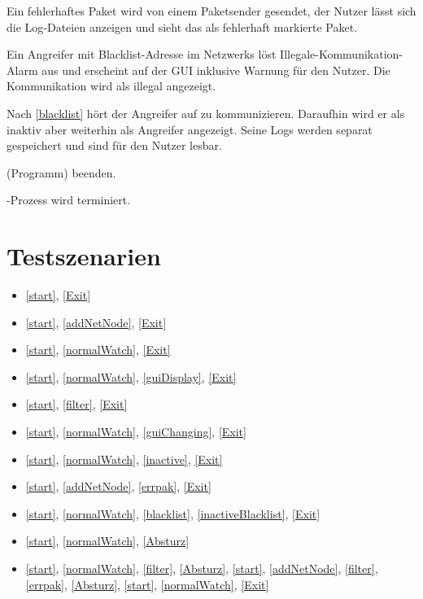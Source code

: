 \begin{description}[style=multiline, leftmargin=4cm, labelwidth=4cm]
  \item[\namedlabel{errpak}{Fehlerhaftes Paket}] Ein fehlerhaftes Paket wird von einem Paketsender gesendet, der Nutzer lässt sich die Log-Dateien anzeigen und sieht das als fehlerhaft markierte Paket.
  \item[\namedlabel{blacklist}{Blacklist}] Ein Angreifer mit Blacklist-Adresse im Netzwerks löst Illegale-Kommunikation-Alarm aus und erscheint auf der GUI inklusive Warnung für den Nutzer. Die Kommunikation wird als illegal angezeigt.
  \item[\namedlabel{inactiveBlacklist}{Inaktiver geblacklisteter Teilnehmer}] Nach \ref{blacklist} hört der Angreifer auf zu kommunizieren. Daraufhin wird er als inaktiv aber weiterhin als Angreifer angezeigt. Seine Logs werden separat gespeichert und sind für den Nutzer lesbar.
  \item[\namedlabel{Exit}{Exit}] \programname (Programm) beenden.
  \item[\namedlabel{Absturz}{Absturz}] \programname-Prozess wird terminiert.
\end{description}

\section{Testszenarien}

\begin{itemize}
  \item \ref{start}, \ref{Exit}
  \item \ref{start}, \ref{addNetNode}, \ref{Exit}
  \item \ref{start}, \ref{normalWatch}, \ref{Exit}
  \item \ref{start}, \ref{normalWatch}, \ref{guiDisplay}, \ref{Exit}
  \item \ref{start}, \ref{filter}, \ref{Exit}
  \item \ref{start}, \ref{normalWatch}, \ref{guiChanging}, \ref{Exit}
  \item \ref{start}, \ref{normalWatch}, \ref{inactive}, \ref{Exit}
  \item \ref{start}, \ref{addNetNode}, \ref{errpak}, \ref{Exit}
  \item \ref{start}, \ref{normalWatch}, \ref{blacklist}, \ref{inactiveBlacklist}, \ref{Exit}
  \item \ref{start}, \ref{normalWatch}, \ref{Absturz}
  \item \ref{start}, \ref{normalWatch}, \ref{filter}, \ref{Absturz}, \ref{start}, \ref{addNetNode}, \ref{filter}, \ref{errpak}, \ref{Absturz}, \ref{start}, \ref{normalWatch}, \ref{Exit}
\end{itemize} 